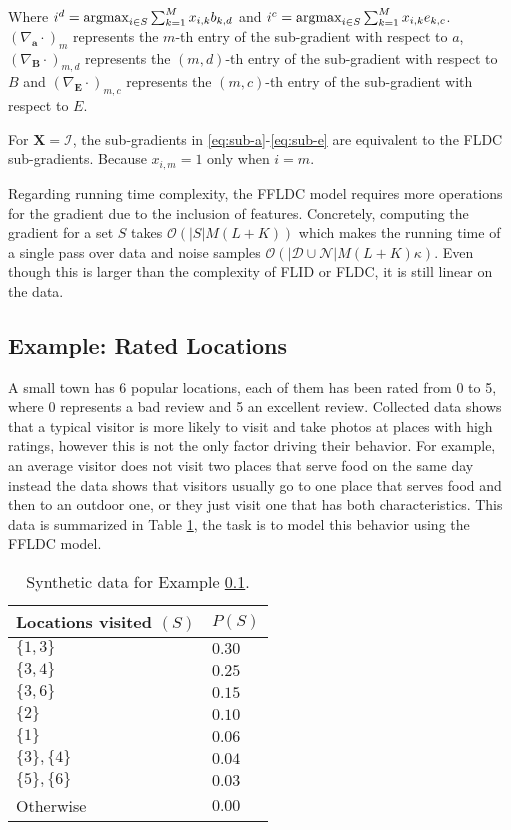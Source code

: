 Where $i^{d} = \operatorname*{argmax}_{i \in S}{\sum_{k=1}^{M}{x_{i,k}b_{k,d}}}$ and $i^{c} = \operatorname*{argmax}_{i \in S}{\sum_{k=1}^{M}x_{i,k}e_{k,c}}$. $\left(\nabla_{\mathbf{a}}\cdot \right)_{m}$ represents the $m$-th entry of the sub-gradient with respect to $a$, $\left(\nabla_{\mathbf{B}}\cdot\right)_{m,d}$ represents the $(m,d)$-th entry of the sub-gradient with respect to $B$ and $\left(\nabla_{\mathbf{E}}\cdot\right)_{m,c}$ represents the $(m,c)$-th entry of the sub-gradient with respect to $E$.

\begin{remark}
  For $\mathbf{X} = \mathcal{I}$, the sub-gradients in \ref{eq:sub-a}-\ref{eq:sub-e} are equivalent to the FLDC sub-gradients. Because $x_{i,m} = 1$ only when $i = m$.
\end{remark}

Regarding running time complexity, the FFLDC model requires more operations for the gradient due to the inclusion of features. Concretely, computing the gradient for a set $S$ takes $\mathcal{O}(|S|M(L+K))$ which makes the running time of a single pass over data and noise samples $\mathcal{O}(|\mathcal{D}\cup\mathcal{N}|M(L+K)\kappa)$. Even though this is larger than the complexity of FLID or FLDC, it is still linear on the data.

\subsection{Example: Rated Locations}
\label{sec:ffldc-toy}

A small town has 6 popular locations, each of them has been rated from 0 to 5, where 0 represents a bad review and 5 an excellent review. Collected data shows that a typical visitor is more likely to visit and take photos at places with high ratings, however this is not the only factor driving their behavior. For example, an average visitor does not visit two places that serve food on the same day instead the data shows that visitors usually go to one place that serves food and then to an outdoor one, or they just visit one that has both characteristics. This data is summarized in Table \ref{tab:ffldc-toy-probs}, the task is to model this behavior using the FFLDC model.

\begin{table}
  \centering
  \caption{Synthetic data for Example \ref{sec:ffldc-toy}.}
  \begin{tabular}{@{}ll@{}}
    \toprule
    Locations visited $(S)$ & $P(S)$  \\
    \midrule
    $\{1,3\}$ & $0.30$ \\
    $\{3,4\}$ & $0.25$ \\
    $\{3,6\}$ & $0.15$ \\
    $\{2\}$ & $0.10$ \\
    $\{1\}$ & $0.06$ \\
    $\{3\}, \{4\}$ & $0.04$ \\
    $\{5\}, \{6\}$ & $0.03$ \\
    Otherwise & $0.00$ \\
    \bottomrule
  \end{tabular}
  \label{tab:ffldc-toy-probs}
\end{table}

